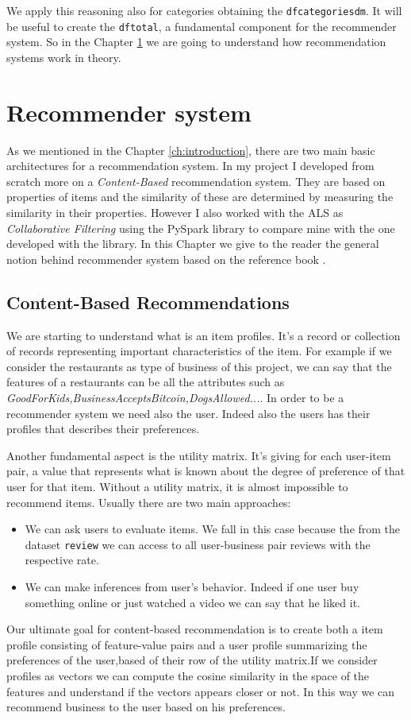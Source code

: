 \documentclass[12pt,english]{report}
\begin{document}
We apply this reasoning also for categories obtaining the \texttt{df\textunderscore categories\textunderscore dm}. It will be useful to create the \texttt{df\textunderscore total}, a fundamental component for the recommender system. So in the Chapter \ref{ch:recsys} we are going to understand how recommendation systems work in theory.
\chapter{Recommender system}\label{ch:recsys}
As we mentioned in the Chapter \ref{ch:introduction}, there are two main basic architectures for a recommendation system. In my project I developed from scratch  more on a \textit{Content-Based} recommendation system. They are based on properties of items and the similarity of these are determined by measuring the similarity in their properties.
However I also worked with the ALS as \textit{Collaborative Filtering} using the PySpark library to compare mine with the one developed with the library. In this Chapter we give to the reader the general notion behind recommender system based on the reference book \cite{rajaraman2014mining}.
\section{Content-Based Recommendations}
We are starting to understand what is an item profiles. It's a record or collection of records representing important characteristics of the item. For example if we consider the restaurants as type of business of this project, we can say that the features of a restaurants can be all the attributes such as \textit{GoodForKids,BusinessAcceptsBitcoin,DogsAllowed...}.
In order to be a recommender system we need also the user. Indeed also the users has their profiles that describes their preferences. \par
Another fundamental aspect is the utility matrix. It's giving for each user-item pair, a value that represents what is known about the degree of preference of that user for that item. Without a utility matrix, it is almost impossible to recommend items. Usually there are two main approaches: 
\begin{itemize}
 \item We can ask users to evaluate items. We fall in this case because the from the dataset \texttt{review} we can access to all user-business pair reviews with the respective rate.
 \item We can make inferences from user's behavior. Indeed if one user buy something online or just watched a video we can say that he liked it.
 \end{itemize} 
Our ultimate goal for content-based recommendation is to create both a item profile consisting of feature-value pairs and a user profile summarizing the preferences of the user,based of their row of the utility matrix.If we consider profiles as vectors we can compute the cosine similarity in the space of the features and understand if the vectors appears closer or not. In this way we can recommend business to the user based on his preferences.
\end{document}
